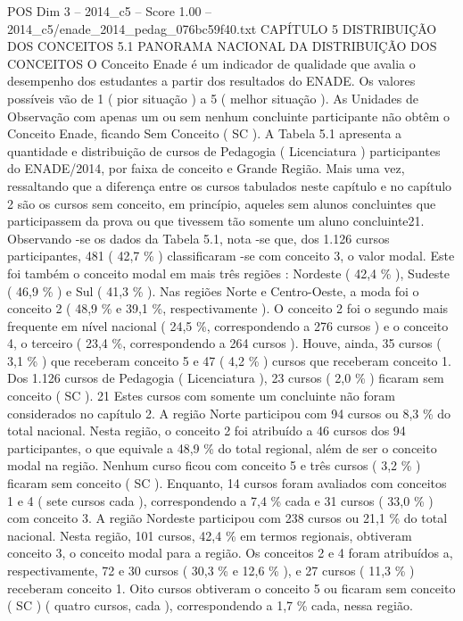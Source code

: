 \begin{textsample}{POS Dim 3 – 2014\_c5 – Score 1.00 – 2014\_c5/enade\_2014\_pedag\_076bc59f40.txt}  \label{ex:f3_pos_219}
CAPÍTULO 5 DISTRIBUIÇÃO DOS CONCEITOS 5.1 PANORAMA NACIONAL DA DISTRIBUIÇÃO DOS CONCEITOS O Conceito Enade é um indicador de qualidade que avalia o desempenho dos estudantes a partir dos resultados do ENADE.
Os valores possíveis vão de 1 ( pior situação ) a 5 ( melhor situação ).
As Unidades de Observação com apenas um ou sem nenhum concluinte participante não obtêm o Conceito Enade, ficando Sem Conceito ( SC ).
A Tabela 5.1 apresenta a quantidade e distribuição de cursos de Pedagogia ( Licenciatura ) participantes do ENADE/2014, por faixa de conceito e Grande Região.
Mais uma vez, ressaltando que a diferença entre os cursos tabulados neste capítulo e no capítulo 2 são os cursos sem conceito, em princípio, aqueles sem alunos concluintes que participassem da prova ou que tivessem tão somente um aluno concluinte21.
Observando -se os dados da Tabela 5.1, nota -se que, dos 1.126 cursos participantes, 481 ( 42,7 \% ) classificaram -se com conceito 3, o valor modal.
Este foi também o conceito modal em mais três regiões : Nordeste ( 42,4 \% ), Sudeste ( 46,9 \% ) e Sul ( 41,3 \% ).
Nas regiões Norte e Centro-Oeste, a moda foi o conceito 2 ( 48,9 \% e 39,1 \%, respectivamente ).
O conceito 2 foi o segundo mais frequente em nível nacional ( 24,5 \%, correspondendo a 276 cursos ) e o conceito 4, o terceiro ( 23,4 \%, correspondendo a 264 cursos ).
Houve, ainda, 35 cursos ( 3,1 \% ) que receberam conceito 5 e 47 ( 4,2 \% ) cursos que receberam conceito 1.
Dos 1.126 cursos de Pedagogia ( Licenciatura ), 23 cursos ( 2,0 \% ) ficaram sem conceito ( SC ). 21 Estes cursos com somente um concluinte não foram considerados no capítulo 2.
A região Norte participou com 94 cursos ou 8,3 \% do total nacional.
Nesta região, o conceito 2 foi atribuído a 46 cursos dos 94 participantes, o que equivale a 48,9 \% do total regional, além de ser o conceito modal na região.
Nenhum curso ficou com conceito 5 e três cursos ( 3,2 \% ) ficaram sem conceito ( SC ).
Enquanto, 14 cursos foram avaliados com conceitos 1 e 4 ( sete cursos cada ), correspondendo a 7,4 \% cada e 31 cursos ( 33,0 \% ) com conceito 3.
A região Nordeste participou com 238 cursos ou 21,1 \% do total nacional.
Nesta região, 101 cursos, 42,4 \% em termos regionais, obtiveram conceito 3, o conceito modal para a região.
Os conceitos 2 e 4 foram atribuídos a, respectivamente, 72 e 30 cursos ( 30,3 \% e 12,6 \% ), e 27 cursos ( 11,3 \% ) receberam conceito 1.
Oito cursos obtiveram o conceito 5 ou ficaram sem conceito ( SC ) ( quatro cursos, cada ), correspondendo a 1,7 \% cada, nessa região.

\end{textsample}
